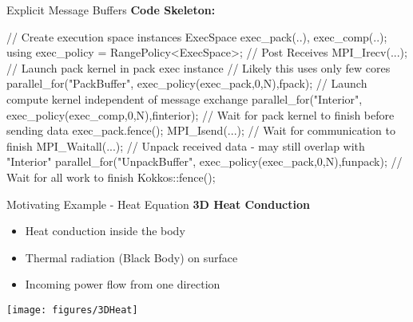 \begin{frame}[fragile]{Explicit Message Buffers}
\textbf{Code Skeleton:}
\begin{code}[keywords={MPI_Irecv,parallel_for,fence,MPI_Isend,MPI_Waitall}]
  // Create execution space instances
  ExecSpace exec_pack(..), exec_comp(..);
  using exec_policy = RangePolicy<ExecSpace>;
  // Post Receives
  MPI_Irecv(...);
  // Launch pack kernel in pack exec instance
  // Likely this uses only few cores
  parallel_for("PackBuffer",
    exec_policy(exec_pack,0,N),fpack);
  // Launch compute kernel independent of message exchange
  parallel_for("Interior",
    exec_policy(exec_comp,0,N),finterior);
  // Wait for pack kernel to finish before sending data
  exec_pack.fence();
  MPI_Isend(...);
  // Wait for communication to finish
  MPI_Waitall(...);
  // Unpack received data - may still overlap with "Interior"
  parallel_for("UnpackBuffer",
    exec_policy(exec_pack,0,N),funpack);
  // Wait for all work to finish
  Kokkos::fence();
\end{code}

\end{frame}

\begin{frame}{Motivating Example - Heat Equation}
\textbf{3D Heat Conduction}
\begin{itemize}
\item Heat conduction inside the body
\item Thermal radiation (Black Body) on surface
\item Incoming power flow from one direction
\end{itemize}

\texttt{[image: figures/3DHeat]}
\end{frame}

